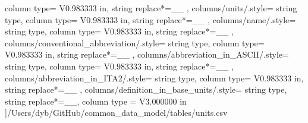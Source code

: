 \begin{landscape}
{            column type= V{0.983333 in}, 
            string replace*={_}{\_}
        },
    columns/units/.style={
            string type, 
            column type= V{0.983333 in}, 
            string replace*={_}{\_}
        },
    columns/name/.style={
            string type, 
            column type= V{0.983333 in}, 
            string replace*={_}{\_}
        },
    columns/conventional_abbreviation/.style={
            string type, 
            column type= V{0.983333 in}, 
            string replace*={_}{\_}
        },
    columns/abbreviation_in_ASCII/.style={
            string type, 
            column type= V{0.983333 in}, 
            string replace*={_}{\_}
        },
    columns/abbreviation_in_ITA2/.style={
            string type, 
            column type= V{0.983333 in}, 
            string replace*={_}{\_}
        },
    columns/definition_in_base_units/.style={
            string type, 
            string replace*={_}{\_},
            column type = V{3.000000 in}
        }
    ]{/Users/dyb/GitHub/common_data_model/tables/units.csv}
\end{landscape}
